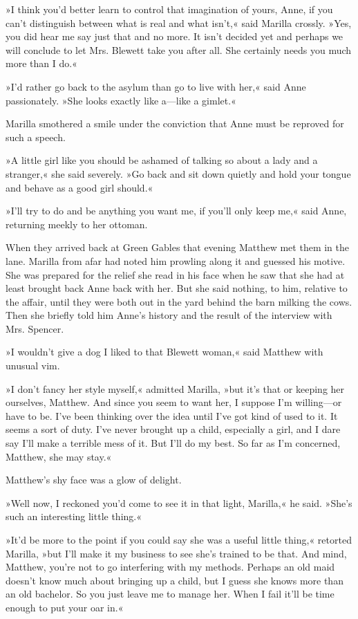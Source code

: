 »I think you'd better learn to control that imagination of yours, Anne, if you can't distinguish between what is real and what isn't,« said Marilla crossly. »Yes, you did hear me say just that and no more. It isn't decided yet and perhaps we will conclude to let Mrs. Blewett take you after all. She certainly needs you much more than I do.«

»I'd rather go back to the asylum than go to live with her,« said Anne passionately. »She looks exactly like a—like a gimlet.«

Marilla smothered a smile under the conviction that Anne must be reproved for such a speech.

»A little girl like you should be ashamed of talking so about a lady and a stranger,« she said severely. »Go back and sit down quietly and hold your tongue and behave as a good girl should.«

»I'll try to do and be anything you want me, if you'll only keep me,« said Anne, returning meekly to her ottoman.

When they arrived back at Green Gables that evening Matthew met them in the lane. Marilla from afar had noted him prowling along it and guessed his motive. She was prepared for the relief she read in his face when he saw that she had at least brought back Anne back with her. But she said nothing, to him, relative to the affair, until they were both out in the yard behind the barn milking the cows. Then she briefly told him Anne's history and the result of the interview with Mrs. Spencer.

»I wouldn't give a dog I liked to that Blewett woman,« said Matthew with unusual vim.

»I don't fancy her style myself,« admitted Marilla, »but it's that or keeping her ourselves, Matthew. And since you seem to want her, I suppose I'm willing—or have to be. I've been thinking over the idea until I've got kind of used to it. It seems a sort of duty. I've never brought up a child, especially a girl, and I dare say I'll make a terrible mess of it. But I'll do my best. So far as I'm concerned, Matthew, she may stay.«

Matthew's shy face was a glow of delight.

»Well now, I reckoned you'd come to see it in that light, Marilla,« he said. »She's such an interesting little thing.«

»It'd be more to the point if you could say she was a useful little thing,« retorted Marilla, »but I'll make it my business to see she's trained to be that. And mind, Matthew, you're not to go interfering with my methods. Perhaps an old maid doesn't know much about bringing up a child, but I guess she knows more than an old bachelor. So you just leave me to manage her. When I fail it'll be time enough to put your oar in.«


